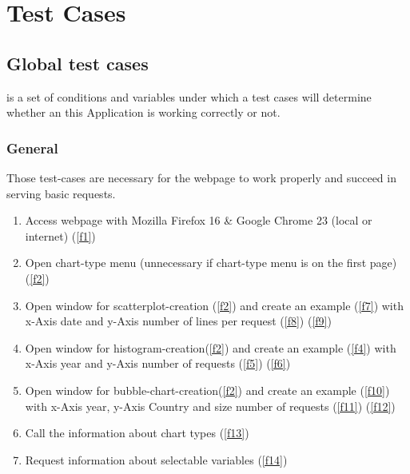 \section{Test Cases}

\subsection{Global test cases}

is a set of conditions and variables under which a test cases will determine whether an this Application is working correctly 
or not.

\renewcommand{\theenumi}{/T\arabic{enumi}0/}
\renewcommand{\labelenumi}{\theenumi}

\subsubsection{General}

Those test-cases are necessary for the webpage to work properly and succeed in serving basic requests.

\begin{enumerate}

\item Access webpage with Mozilla Firefox 16 \& 
Google Chrome 23 (local or internet) (\ref{f1})

\item Open chart-type menu (unnecessary if chart-type menu is on the first page) (\ref{f2})

\item Open window for scatterplot-creation (\ref{f2}) and create an example (\ref{f7})
      with x-Axis date and y-Axis number of lines per request (\ref{f8}) (\ref{f9})

\item Open window for histogram-creation(\ref{f2}) and create an example (\ref{f4})
      with x-Axis year and y-Axis number of requests (\ref{f5}) (\ref{f6})

\item Open window for bubble-chart-creation(\ref{f2}) and create an example (\ref{f10})
      with x-Axis year, y-Axis Country and size number of requests (\ref{f11}) (\ref{f12})

\item Call the information about chart types (\ref{f13})

\item Request information about selectable variables (\ref{f14})

\end{enumerate}

